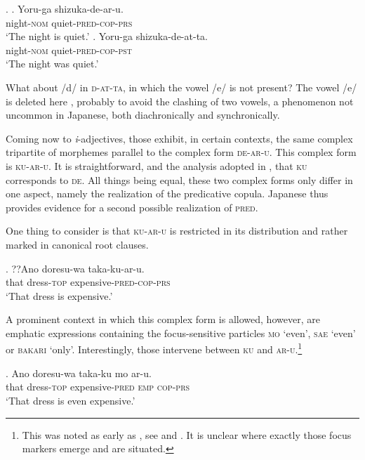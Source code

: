 \documentclass [output=book,colorlinks,citecolor=brown]{langscibook}
\begin{document}
\newpage

\ex. \ag. Yoru-ga shizuka-de-ar-u.\\
night-\textsc{nom} quiet-\textsc{pred-cop-prs}\\
`The night is quiet.'
\bg. Yoru-ga shizuka-de-at-ta.\\
night-\textsc{nom} quiet-\textsc{pred-cop-pst}\\
`The night was quiet.' \null \hfill \citep[189, 194]{nishiyama:1999:adj}

What about /d/ in \textsc{d-at-ta}, in which the vowel /e/ is not present? The vowel /e/ is deleted here \citep[203]{nishiyama:1999:adj}, probably to avoid the clashing of two vowels, a phenomenon not uncommon in Japanese, both diachronically and synchronically. %

Coming now to \textit{i}-adjectives, those exhibit, in certain contexts, the same complex tripartite of morphemes parallel to the complex form \textsc{de-ar-u}. This complex form is \textsc{ku-ar-u}. It is straightforward, and the analysis adopted in \citet{nishiyama:1999:adj}, that \textsc{ku} corresponds to \textsc{de}. All things being equal, these two complex forms only differ in one aspect, namely the realization of the predicative copula. Japanese thus provides evidence for a second possible realization of \textsc{pred}.

One thing to consider is that \textsc{ku-ar-u} is restricted in its distribution and rather marked in canonical root clauses. %

\exg. ??Ano doresu-wa taka-ku-ar-u.\\
that dress-\textsc{top} expensive-\textsc{pred-cop-prs}\\
`That dress is expensive.'

A prominent context in which this complex form is allowed, however, are emphatic expressions containing the focus-sensitive particles \textsc{mo} `even', \textsc{sae} `even' or \textsc{bakari} `only’. Interestingly, those intervene between \textsc{ku} and \textsc{ar-u}.\footnote{This was noted as early as \citet{miyata:1948:nihongo}, see \citet[185]{nishiyama:1999:adj} and \citet{kubo:1992:japanese}. It is unclear where exactly those focus markers emerge and are situated.}

\exg. Ano doresu-wa taka-ku mo ar-u.\\
that dress-\textsc{top} expensive-\textsc{pred} \textsc{emp} \textsc{cop-prs}\\
`That dress is even expensive.'
\end{document}
